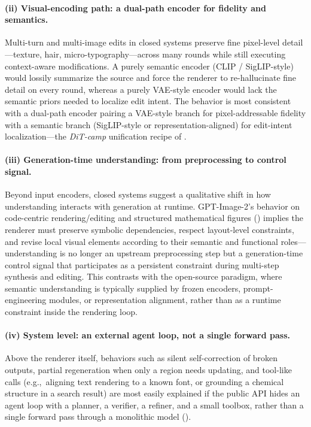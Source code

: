 \documentclass{llmxive}
\begin{document}
\paragraph{(ii) Visual-encoding path: a dual-path encoder for fidelity and semantics.}
Multi-turn and multi-image edits in closed systems preserve fine pixel-level detail---texture, hair, micro-typography---across many rounds while still executing context-aware modifications. A purely semantic encoder (CLIP / SigLIP-style) would lossily summarize the source and force the renderer to re-hallucinate fine detail on every round, whereas a purely VAE-style encoder would lack the semantic priors needed to localize edit intent. The behavior is most consistent with a dual-path encoder pairing a VAE-style branch for pixel-addressable fidelity with a semantic branch (SigLIP-style or representation-aligned) for edit-intent localization---the \emph{DiT-camp} unification recipe of .


\paragraph{(iii) Generation-time understanding: from preprocessing to control signal.}
Beyond input encoders, closed systems suggest a qualitative shift in how understanding interacts with generation at runtime. GPT-Image-2's behavior on code-centric rendering/editing and structured mathematical figures () implies the renderer must preserve symbolic dependencies, respect layout-level constraints, and revise local visual elements according to their semantic and functional roles---understanding is no longer an upstream preprocessing step but a generation-time control signal that participates as a persistent constraint during multi-step synthesis and editing. This contrasts with the open-source paradigm, where semantic understanding is typically supplied by frozen encoders, prompt-engineering modules, or representation alignment, rather than as a runtime constraint inside the rendering loop.

\paragraph{(iv) System level: an external agent loop, not a single forward pass.}
Above the renderer itself, behaviors such as silent self-correction of broken outputs, partial regeneration when only a region needs updating, and tool-like calls (e.g.,~aligning text rendering to a known font, or grounding a chemical structure in a search result) are most easily explained if the public API hides an agent loop with a planner, a verifier, a refiner, and a small toolbox, rather than a single forward pass through a monolithic model ().
\end{document}
